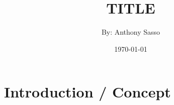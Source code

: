 \documentclass{article}
\title      {\Huge TITLE}
\author     {By: Anthony Sasso}
\date       {\today}
\begin{document}
    \maketitle

    \begin{versionhistory}
    \end{versionhistory}

    \tableofcontents

    \newpage
    \section{Introduction / Concept}
\end{document}
